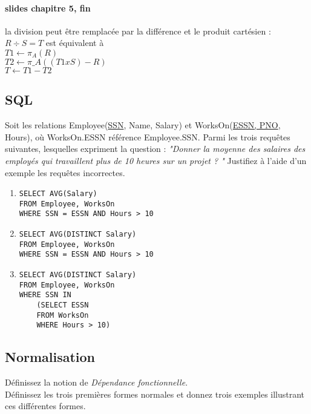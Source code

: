 \paragraph{slides chapitre 5, fin}
la division peut être remplacée par la différence et le produit cartésien :
$R \div S = T$ est équivalent à \\
$T1 \leftarrow \pi_{A}(R)$\\
$T2 \leftarrow \pi\_{A}((T1 x S) -R)$\\
$T \leftarrow T1 - T2 $\\

\subsection{SQL}
Soit les relations Employee(\underline{SSN}, Name, Salary) et WorksOn(\underline{ESSN, PNO}, Hours), 
où WorksOn.ESSN référence Employee.SSN.
Parmi les trois requêtes suivantes, lesquelles expriment la question : 
\textit{"Donner la moyenne des salaires des employés qui travaillent plus de 10 heures sur un projet ? "} Justifiez à l'aide d'un exemple les requêtes incorrectes.\\
\begin{enumerate}
\item 
\begin{lstlisting}
SELECT AVG(Salary) 
FROM Employee, WorksOn
WHERE SSN = ESSN AND Hours > 10 
\end{lstlisting}
\item 
\begin{lstlisting}
SELECT AVG(DISTINCT Salary) 
FROM Employee, WorksOn
WHERE SSN = ESSN AND Hours > 10 
\end{lstlisting}	
\item 
\begin{lstlisting}
SELECT AVG(DISTINCT Salary) 
FROM Employee, WorksOn
WHERE SSN IN 
	(SELECT ESSN 
	FROM WorksOn 
	WHERE Hours > 10) 
\end{lstlisting}
\end{enumerate}



\subsection{Normalisation}
Définissez la notion de \textit{Dépendance fonctionnelle}.\\
Définissez les trois premières formes normales et donnez trois exemples 
illustrant ces différentes formes.

